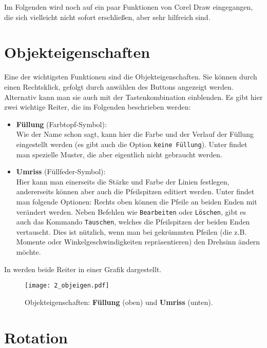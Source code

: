 Im Folgenden wird noch auf ein paar Funktionen von Corel Draw eingegangen, die
sich vielleicht nicht sofort erschließen, aber sehr hilfreich sind.

\section{Objekteigenschaften}

Eine der wichtigsten Funktionen sind die Objekteigenschaften. Sie können durch
einen Rechtsklick, gefolgt durch anwählen des Buttons 
angezeigt werden. Alternativ kann man sie auch mit der Tastenkombination
 einblenden. Es gibt hier zwei wichtige Reiter, die im
Folgenden beschrieben werden:

\begin{itemize}
  \item {\bf Füllung} (Farbtopf-Symbol):\\
    Wie der Name schon sagt, kann hier die Farbe und der Verlauf der Füllung
    eingestellt werden (es gibt auch die Option {\tt keine Füllung}). Unter
     findet man spezielle Muster, die aber eigentlich nicht
    gebraucht werden.
  \item {\bf Umriss} (Füllfeder-Symbol):\\
    Hier kann man einerseits die Stärke und Farbe der Linien festlegen,
    andererseits können aber auch die Pfeilspitzen editiert werden. Unter
     findet man folgende Optionen: Rechts oben können die
    Pfeile an beiden Enden mit  verändert werden. Neben
    Befehlen wie {\tt Bearbeiten} oder {\tt Löschen}, gibt es auch das
    Kommando {\tt Tauschen}, welches die Pfeilspitzen der beiden Enden
    vertauscht. Dies ist nützlich, wenn man bei gekrümmten Pfeilen (die z.B.
    Momente oder Winkelgeschwindigkeiten repräsentieren) den Drehsinn
    ändern möchte.
\end{itemize}

In  werden beide Reiter in einer Grafik dargestellt.

\begin{figure}[htbp]
  \texttt{[image: 2\_objeigen.pdf]}
  \caption{Objekteigenschaften: {\bf Füllung} (oben) und {\bf Umriss} (unten).}
  \label{fig:objarrow}
\end{figure}

\clearpage
\section{Rotation}

